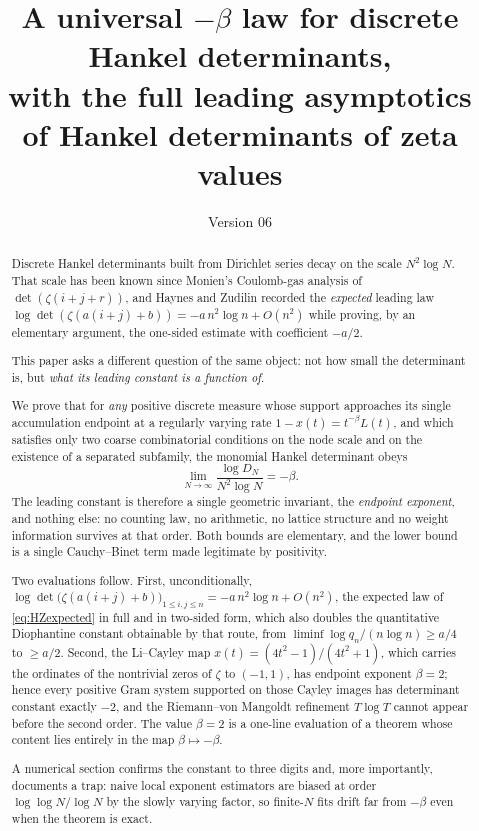 \documentclass[11pt]{amsart}
\title[A universal $-\beta$ law]{A universal $-\beta$ law for discrete Hankel determinants,\\
with the full leading asymptotics\\
of Hankel determinants of zeta values}
\author{}
\date{Version 06}
\numberwithin{equation}{section}
\theoremstyle{plain}
\theoremstyle{definition}
\theoremstyle{remark}
\begin{document}
\begin{abstract}
Discrete Hankel determinants built from Dirichlet series decay on the scale $N^{2}\log N$.
That scale has been known since Monien's Coulomb-gas analysis of $\det(\zeta(i+j+r))$, and
Haynes and Zudilin recorded the \emph{expected} leading law
$\log\det(\zeta(a(i+j)+b))=-a\,n^{2}\log n+O(n^{2})$ while proving, by an elementary argument, the
one-sided estimate with coefficient $-a/2$.

This paper asks a different question of the same object: not how small the determinant is, but
\emph{what its leading constant is a function of}.

We prove that for \emph{any} positive discrete measure whose support approaches its single
accumulation endpoint at a regularly varying rate
$1-x(t)=t^{-\beta}L(t)$, and which satisfies only two coarse combinatorial conditions on the
node scale and on the existence of a separated subfamily, the monomial Hankel determinant obeys
\[
\lim_{N\to\infty}\frac{\log D_{N}}{N^{2}\log N}=-\beta .
\]
The leading constant is therefore a single geometric invariant, the \emph{endpoint exponent},
and nothing else: no counting law, no arithmetic, no lattice structure and no weight
information survives at that order. Both bounds are elementary, and the lower bound is a single
Cauchy--Binet term made legitimate by positivity.

Two evaluations follow. First, unconditionally,
$\log\det\bigl(\zeta(a(i+j)+b)\bigr)_{1\le i,j\le n}=-a\,n^{2}\log n+O(n^{2})$, the expected law of
\eqref{eq:HZexpected} in full and in two-sided form, which also doubles the quantitative Diophantine
constant obtainable by that route, from $\liminf\log q_{n}/(n\log n)\ge a/4$ to $\ge a/2$.
Second, the Li--Cayley
map $x(t)=(4t^{2}-1)/(4t^{2}+1)$, which carries the ordinates of the nontrivial zeros of $\zeta$
to $(-1,1)$, has endpoint exponent $\beta=2$; hence every positive Gram system supported on those
Cayley images has determinant constant exactly $-2$, and the Riemann--von Mangoldt refinement
$T\log T$ cannot appear before the second order. The value $\beta=2$ is a one-line evaluation of a
theorem whose content lies entirely in the map $\beta\mapsto-\beta$.

A numerical section confirms the constant to three digits and, more importantly, documents a
trap: naive local exponent estimators are biased at order $\log\log N/\log N$ by the slowly
varying factor, so finite-$N$ fits drift far from $-\beta$ even when the theorem is exact.
\end{abstract}
\end{document}
